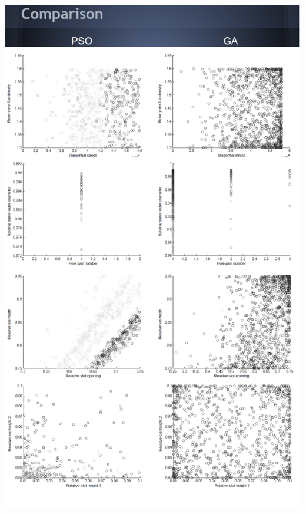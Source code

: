 \documentclass[twoside]{article}
\begin{document}
\includegraphics[width=\textwidth,height=\textheight,keepaspectratio]{results2.png}
\newpage
\end{document}
